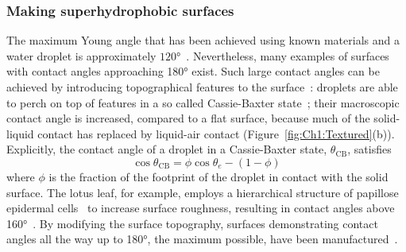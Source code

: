 \subsubsection{Making superhydrophobic surfaces}
The maximum Young angle that has been achieved using known materials and a water droplet is approximately $ 120\si{\degree}$~\citep{Blow2010Langmuir}. Nevertheless, many examples of surfaces with contact angles approaching 180$\si{\degree}$ exist. Such large contact angles can be achieved by introducing topographical features to the surface~\citep{Bico2001EPL}: droplets are able to perch on top of features in a so called Cassie-Baxter state~\citep{Cassie1944TransFaraday,Cassie1948FaradayDiscuss}; their macroscopic contact angle is increased, compared to a flat surface, because much of the solid-liquid contact has replaced by liquid-air contact (Figure~\ref{fig:Ch1:Textured}(b)). Explicitly, the contact angle of a droplet in a Cassie-Baxter state, $\theta_{\text{CB}}$, satisfies~\citep{Lafuma2003NatureMat}
\begin{equation}
\cos  \theta_{\text{CB}} = \phi \cos \theta_e - (1-\phi)
\end{equation}
where $\phi$ is the fraction of the footprint of the droplet in contact with the solid surface. The lotus leaf, for example, employs a hierarchical structure of papillose epidermal cells~\citep{Neinhuis1997AnnBot} to increase
surface roughness, resulting in contact angles above 160$\si{\degree}$~\citep{Barthlott1997Planta}. By modifying the surface topography, surfaces demonstrating contact angles all the way up to 180\si{\degree}, the maximum possible, have been manufactured~\citep{Bico1999EPL, Quere2005RepProgPhys}.

